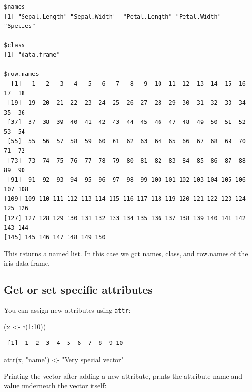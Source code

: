 \documentclass[
]{book}
\newenvironment{Shaded}{\begin{snugshade}}{\end{snugshade}}
\newcommand{\DecValTok}[1]{\textcolor[rgb]{0.00,0.00,0.81}{#1}}
\newcommand{\FunctionTok}[1]{\textcolor[rgb]{0.00,0.00,0.00}{#1}}
\newcommand{\NormalTok}[1]{#1}
\newcommand{\OtherTok}[1]{\textcolor[rgb]{0.56,0.35,0.01}{#1}}
\newcommand{\SpecialCharTok}[1]{\textcolor[rgb]{0.00,0.00,0.00}{#1}}
\newcommand{\StringTok}[1]{\textcolor[rgb]{0.31,0.60,0.02}{#1}}
\begin{document}
\begin{verbatim}
$names
[1] "Sepal.Length" "Sepal.Width"  "Petal.Length" "Petal.Width"  "Species"     

$class
[1] "data.frame"

$row.names
  [1]   1   2   3   4   5   6   7   8   9  10  11  12  13  14  15  16  17  18
 [19]  19  20  21  22  23  24  25  26  27  28  29  30  31  32  33  34  35  36
 [37]  37  38  39  40  41  42  43  44  45  46  47  48  49  50  51  52  53  54
 [55]  55  56  57  58  59  60  61  62  63  64  65  66  67  68  69  70  71  72
 [73]  73  74  75  76  77  78  79  80  81  82  83  84  85  86  87  88  89  90
 [91]  91  92  93  94  95  96  97  98  99 100 101 102 103 104 105 106 107 108
[109] 109 110 111 112 113 114 115 116 117 118 119 120 121 122 123 124 125 126
[127] 127 128 129 130 131 132 133 134 135 136 137 138 139 140 141 142 143 144
[145] 145 146 147 148 149 150
\end{verbatim}

This returns a named list. In this case we got names, class, and row.names of the iris data frame.

\hypertarget{get-or-set-specific-attributes}{%
\subsection{Get or set specific attributes}\label{get-or-set-specific-attributes}}

You can assign new attributes using \texttt{attr}:

\begin{Shaded}
\begin{Highlighting}[]
\NormalTok{(x }\OtherTok{\textless{}{-}} \FunctionTok{c}\NormalTok{(}\DecValTok{1}\SpecialCharTok{:}\DecValTok{10}\NormalTok{))}
\end{Highlighting}
\end{Shaded}

\begin{verbatim}
 [1]  1  2  3  4  5  6  7  8  9 10
\end{verbatim}

\begin{Shaded}
\begin{Highlighting}[]
\FunctionTok{attr}\NormalTok{(x, }\StringTok{"name"}\NormalTok{) }\OtherTok{\textless{}{-}} \StringTok{"Very special vector"}
\end{Highlighting}
\end{Shaded}

Printing the vector after adding a new attribute, prints the attribute name and value underneath the vector itself:
\end{document}
